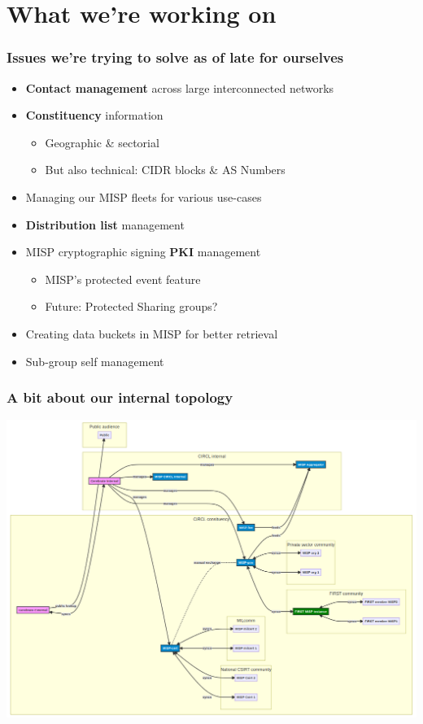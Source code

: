 \section{What we're working on}

\begin{frame}
\frametitle{Issues we're trying to solve as of late for ourselves}
    \begin{itemize}
        \item {\bf Contact management} across large interconnected networks
        \item {\bf Constituency} information
         \begin{itemize}
            \item Geographic \& sectorial
            \item But also technical: CIDR blocks \& AS Numbers
        \end{itemize}
	\item Managing our MISP fleets for various use-cases
	\item {\bf Distribution list} management
	\item MISP cryptographic signing {\bf PKI} management
	 \begin{itemize}
            \item MISP's protected event feature
            \item Future: Protected Sharing groups? 
        \end{itemize}
        \item Creating data buckets in MISP for better retrieval
        \item Sub-group self management
    \end{itemize}
\end{frame}

\begin{frame}
\frametitle{A bit about our internal topology}
  \begin{center}
    \includegraphics[width=1\linewidth]{pictures/our_topology.png}
  \end{center}
\end{frame}


